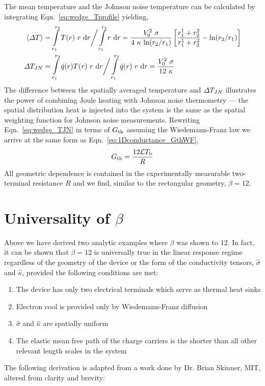 The mean temperature and the Johnson noise temperature can be calculated by integrating Eqn.~\ref{eq:wedge_Tprofile} yielding,
\begin{align}
\langle\Delta T\rangle &= \int\limits_{r_1}^{r_2}T(r)~r~\mathrm{d}r \bigg/ \int\limits_{r_1}^{r_2}r~\mathrm{d}r =\frac{V_0^2~\sigma}{4~\kappa~\mathrm{ln}(r_2/r_1)}\left[\frac{r_1^1+r_2^2}{r_1^1+r_2^2}-\mathrm{ln}(r_2/r_1)\right] \\
\Delta T_{JN} &= \int\limits_{r_1}^{r_2}\dot{q}(r)T(r)~r~\mathrm{d}r \bigg/ \int\limits_{r_1}^{r_2}\dot{q}(r)~r~\mathrm{d}r = \frac{V_0^2~\sigma}{12~\kappa}\label{eq:wedge_TJN}
\end{align}
The difference between the spatially averaged temperature and $\Delta T_{JN}$ illustrates the power of combining Joule heating with Johnson noise thermometry --- the spatial distribution heat is injected into the system is the same as the spatial weighting function for Johnson noise measurements. Rewriting Eqn.~\ref{eq:wedge_TJN} in terms of $G_{\mathrm{th}}$ assuming the Wiedemann-Franz law we arrive at the same form as Eqn.~\ref{eq:1Dconductance_GthWF},
\begin{equation}\label{eq:wedge_GthWF}
G_{\mathrm{th}} = \frac{12\mathcal{L} T_\mathrm{b}}{R}
\end{equation}
All geometric dependence is contained in the experimentally measurable two-terminal resistance $R$ and we find, similar to the rectangular geometry, $\beta = 12$.

\section{Universality of $\beta$}
\label{section:beta}
Above we have derived two analytic examples where $\beta$ was shown to $12$. In fact, it can be shown that $\beta = 12$ is universally true in the linear response regime regardless of the geometry of the device or the form of the conductivity tensors, $\hat\sigma$ and $\hat\kappa$, provided the following conditions are met:
\begin{enumerate}
\item The device has only two electrical terminals which serve as thermal heat sinks
\item Electron cool is provided only by Wiedemann-Franz diffusion
\item $\hat\sigma$ and $\hat\kappa$ are spatially uniform
\item The elastic mean free path of the charge carriers is the shorter than all other relevant length scales in the system
\end{enumerate}
The following derivation is adapted from a work done by Dr. Brian Skinner, MIT, altered from clarity and brevity:

